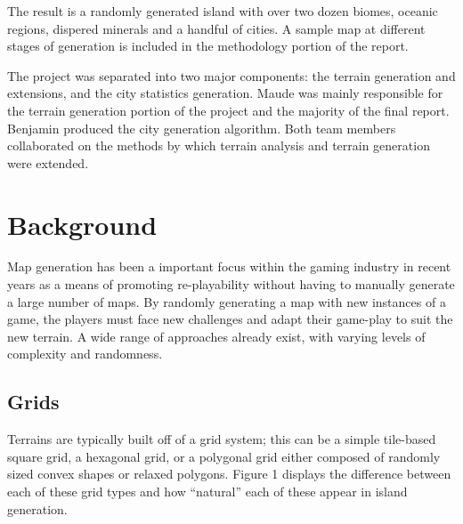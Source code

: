 The result is a randomly generated island with over two dozen biomes, oceanic regions, dispered minerals and a handful of cities. A sample map at different stages of generation is included in the methodology portion of the report. 

The project was separated into two major components: the terrain generation and extensions, and the city statistics generation. Maude was mainly responsible for the terrain generation portion of the project and the majority of the final report. Benjamin produced the city generation algorithm. Both team members collaborated on the methods by which terrain analysis and terrain generation were extended.  

\section{Background}
Map generation has been a important focus within the gaming industry in recent years as a means of promoting re-playability without having to manually generate a large number of maps. By randomly generating a map with new instances of a game, the players must face new challenges and adapt their game-play to suit the new terrain. A wide range of approaches already exist, with varying levels of complexity and randomness.

\subsection{Grids}
Terrains are typically built off of a grid system; this can be a simple tile-based square grid, a hexagonal grid, or a polygonal grid either composed of randomly sized convex shapes or relaxed polygons. Figure 1 displays the difference between each of these grid types and how ``natural'' each of these appear in island generation.

